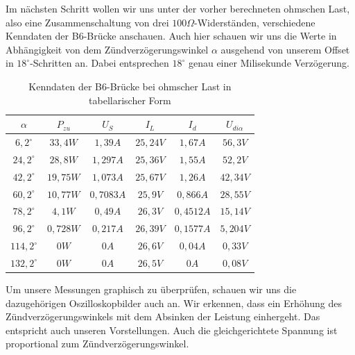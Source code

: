 \documentclass{article}
\begin{document}
Im nächsten Schritt wollen wir uns unter der vorher berechneten ohmschen Last, also eine Zusammenschaltung von drei $100\Omega$-Widerständen, verschiedene Kenndaten der B6-Brücke anschauen. Auch hier schauen wir uns die Werte in Abhängigkeit von dem Zündverzögerungswinkel $\alpha$ ausgehend von unserem Offset in $18^{\circ}$-Schritten an. Dabei entsprechen $18^{\circ}$ genau einer Milisekunde Verzögerung.

\begin{table}[h]
  \centering
  \begin{tabular}{|c|c|c|c|c|c|}
    \hline
    $\alpha$ & $P_{zu}$ & $U_{S}$ & $I_{L}$ & $I_{d}$ & $U_{di\alpha}$\\
    \hline
    $6,2^{\circ}$ & $33,4W$ & $1,39A$ & $25,24V$ & $1,67A$ & $56,3V$\\
    \hline
    $24,2^{\circ}$ & $28,8W$ & $1,297A$ & $25,36V$ & $1,55A$ & $52,2V$\\
    \hline
    $42,2^{\circ}$ & $19,75W$ & $1,073A$ & $25,67V$ & $1,26A$ & $42,34V$\\
    \hline
    $60,2^{\circ}$ & $10,77W$ & $0,7083A$ & $25,9V$ & $0,866A$ & $28,55V$\\
    \hline
    $78,2^{\circ}$ & $4,1W$ & $0,49A$ & $26,3V$ & $0,4512A$ & $15,14V$ \\
    \hline
    $96,2^{\circ}$ & $0,728W$ & $0,217A$ & $26,39V$ & $0,1577A$ & $5,204V$\\
    \hline
    $114,2^{\circ}$ & $0W$ & $0A$ & $26,6V$ & $0,04A$ & $0,33V$\\
    \hline
    $132,2^{\circ}$ & $0W$ & $0A$ & $26,5V$ & $0A$ & $0,08V$\\
    \hline
  \end{tabular}
  \caption{Kenndaten der B6-Brücke bei ohmscher Last in tabellarischer Form}
  \label{tab:mess2}
\end{table}


Um unsere Messungen graphisch zu überprüfen, schauen wir uns die dazugehörigen Oszilloskopbilder auch an. Wir erkennen, dass ein Erhöhung des Zündverzögerungswinkels mit dem Absinken der Leistung einhergeht. Das entspricht auch unseren Vorstellungen. Auch die gleichgerichtete Spannung ist proportional zum Zündverzögerungswinkel.
\end{document}
